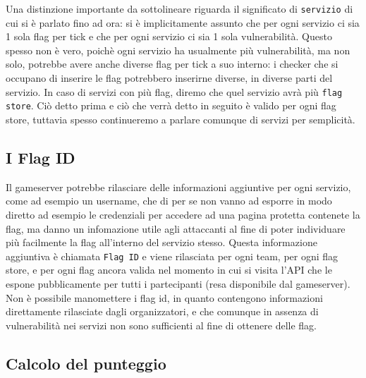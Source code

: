 Una distinzione importante da sottolineare riguarda il significato di \texttt{servizio} di cui si è parlato fino ad ora:
si è implicitamente assunto che per ogni servizio ci sia 1 sola flag per tick e che per ogni servizio ci sia 1 sola vulnerabilità.
Questo spesso non è vero, poichè ogni servizio ha usualmente più vulnerabilità, ma non solo, potrebbe avere anche diverse flag per tick a suo interno:
i checker che si occupano di inserire le flag potrebbero inserirne diverse, in diverse parti del servizio.
In caso di servizi con più flag, diremo che quel servizio avrà più \texttt{flag store}.
Ciò detto prima e ciò che verrà detto in seguito è valido per ogni flag store, tuttavia spesso continueremo a parlare comunque di servizi per semplicità.

\subsection{I Flag ID}

Il gameserver potrebbe rilasciare delle informazioni aggiuntive per ogni servizio, come ad esempio un username, che di per se non vanno
ad esporre in modo diretto ad esempio le credenziali per accedere ad una pagina protetta contenete la flag, ma danno un infomazione utile agli attaccanti al fine di poter
individuare più facilmente la flag all'interno del servizio stesso.
Questa informazione aggiuntiva è chiamata \texttt{Flag ID} e viene rilasciata per ogni team, per ogni flag store, e per ogni flag ancora valida nel momento in cui si visita l'API che
le espone pubblicamente per tutti i partecipanti (resa disponibile dal gameserver). Non è possibile manomettere i flag id, in quanto contengono informazioni direttamente rilasciate dagli organizzatori, e che comunque in assenza di
vulnerabilità nei servizi non sono sufficienti al fine di ottenere delle flag.

\subsection{Calcolo del punteggio}

